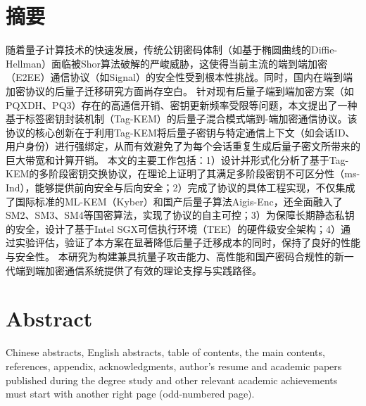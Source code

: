 
\maketitle%
\MAKETITLE%
\makedeclaration%
\intobmk\chapter*{摘\quad 要}%
\setcounter{page}{1}%

随着量子计算技术的快速发展，传统公钥密码体制（如基于椭圆曲线的Diffie-Hellman）面临被Shor算法破解的严峻威胁，这使得当前主流的端到端加密（E2EE）通信协议（如Signal）的安全性受到根本性挑战。同时，国内在端到端加密协议的后量子迁移研究方面尚存空白。
针对现有后量子端到端加密方案（如PQXDH、PQ3）存在的高通信开销、密钥更新频率受限等问题，本文提出了一种基于标签密钥封装机制（Tag-KEM）的后量子混合模式端到-端加密通信协议。该协议的核心创新在于利用Tag-KEM将后量子密钥与特定通信上下文（如会话ID、用户身份）进行强绑定，从而有效避免了为每个会话重复生成后量子密文所带来的巨大带宽和计算开销。
本文的主要工作包括：1）设计并形式化分析了基于Tag-KEM的多阶段密钥交换协议，在理论上证明了其满足多阶段密钥不可区分性（ms-Ind），能够提供前向安全与后向安全；2）完成了协议的具体工程实现，不仅集成了国际标准的ML-KEM（Kyber）和国产后量子算法Aigis-Enc，还全面融入了SM2、SM3、SM4等国密算法，实现了协议的自主可控；3）为保障长期静态私钥的安全，设计了基于Intel SGX可信执行环境（TEE）的硬件级安全架构；4）通过实验评估，验证了本方案在显著降低后量子迁移成本的同时，保持了良好的性能与安全性。
本研究为构建兼具抗量子攻击能力、高性能和国产密码合规性的新一代端到端加密通信系统提供了有效的理论支撑与实践路径。


\intobmk\chapter*{Abstract}%

Chinese abstracts, English abstracts, table of contents, the main contents, references, appendix, acknowledgments, author's resume and academic papers published during the degree study and other relevant academic achievements must start with another right page (odd-numbered page).


\pagestyle{enfrontmatterstyle}%
\cleardoublepage\pagestyle{frontmatterstyle}%

